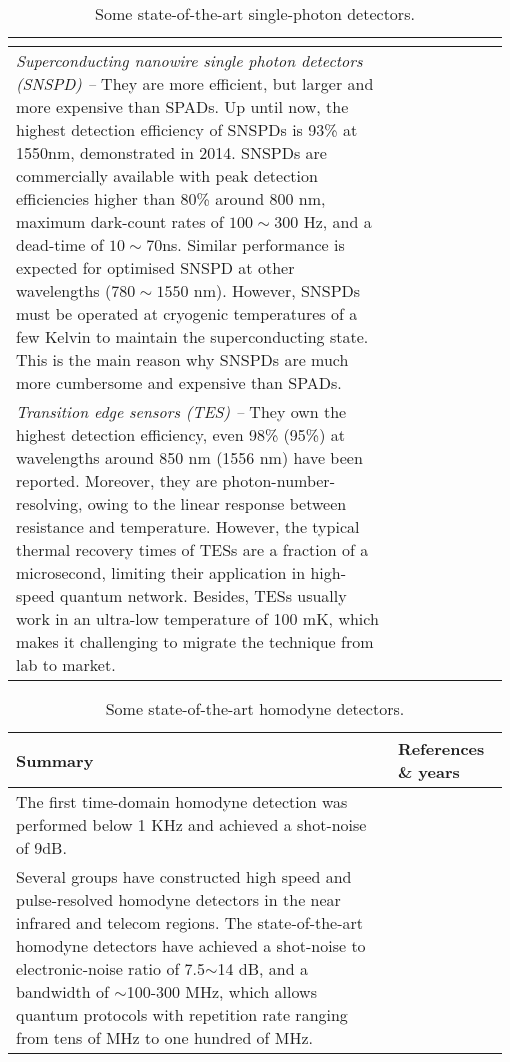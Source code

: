 \begin{table*}[!htbp]
\begin{tabular}{|p{0.755\linewidth}|p{0.22\linewidth}|}
\begin{itemize}
		\end{itemize} &  \cite{bib:shentu2013ultralow} \\
		\hline
		\textit{Superconducting nanowire single photon detectors (SNSPD) --} 
		They are more efficient, but larger and more expensive than SPADs. Up until now, the highest detection efficiency of SNSPDs is 93\% at 1550nm, demonstrated in 2014. SNSPDs are commercially available with peak detection efficiencies higher than 80\% around 800 nm, maximum dark-count rates of $100\sim 300$ Hz, and a dead-time of $10\sim 70$ns. Similar performance is expected for optimised SNSPD at other wavelengths ($780\sim 1550$ nm). However, SNSPDs must be operated at cryogenic temperatures of a few Kelvin to maintain the superconducting state. This is the main reason why SNSPDs are much more cumbersome and expensive than SPADs. &  \cite{bib:marsili2013} \\
		\hline
		\textit{Transition edge sensors (TES) --}
		They own the highest detection efficiency, even 98\% (95\%) at wavelengths around 850 nm (1556 nm) have been reported. Moreover, they are photon-number-resolving, owing to the linear response between resistance and temperature. However, the typical thermal recovery times of TESs are a fraction of a microsecond, limiting their application in high-speed quantum network. Besides, TESs usually work in an ultra-low temperature of 100 mK, which makes it challenging to migrate the technique from lab to market. & \cite{bib:fukuda2011, bib:lita2008} \\
		\hline
	\end{tabular}
	\captionspacetab \caption{Some state-of-the-art single-photon detectors.}\label{tab:photodetection}
\end{table*}

\begin{table*}[!htbp]
	\begin{tabular}{|p{0.755\linewidth}|p{0.22\linewidth}|}
		\hline
	\textbf{Summary} & \textbf{References \& years} \\	\hline \hline
		The first time-domain homodyne detection was performed below 1 KHz and achieved a shot-noise of 9dB. & \cite{bib:Smithey1993} \\
		\hline
		Several groups have constructed high speed and pulse-resolved homodyne detectors in the near infrared and telecom regions. The state-of-the-art homodyne detectors have achieved a shot-noise to electronic-noise ratio of 7.5$\sim$14 dB, and a bandwidth of $\sim$100-300 MHz, which allows quantum protocols with repetition rate ranging from tens of MHz to one hundred of MHz. & \cite{bib:zavatta2002time, bib:okubo2008pulse, bib:kumar2012versatile, bib:chi2011balanced, bib:duan2013} \\
		\hline
	\end{tabular}
	\captionspacetab \caption{Some state-of-the-art homodyne detectors.} \label{tab:homodyning}
\end{table*}


